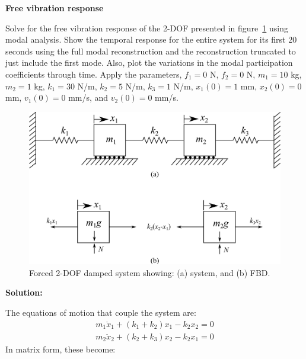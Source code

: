 \documentclass[12pt,letter]{article}
\begin{document}
	\begin{example}
	\textbf{Free vibration response}
	
	Solve for the free vibration response of the 2-DOF presented in figure~\ref{fig:2-DOF-spring_mass_horizontal_double_wall} using modal analysis. Show the temporal response for the entire system for its first 20 seconds using the full modal reconstruction and the reconstruction truncated to just include the first mode. Also, plot the variations in the modal participation coefficients through time. Apply the parameters, $f_1 = 0$ N, $f_2 = 0$ N, $m_1 = 10$ kg, $m_2 = 1$ kg, $k_1 = 30$ N/m, $k_2 = 5$ N/m, $k_3 = 1$ N/m, $x_1(0) = 1$ mm, $x_2(0) = 0$ mm, $v_1(0) = 0$ mm/s, and $v_2(0) = 0$ mm/s.
	
	\begin{figure}[H]
		\centering
		\includegraphics[]{../figures/2-DOF-spring_mass_horizontal_double_wall.png}
		\caption{Forced 2-DOF damped system showing: (a) system, and (b) FBD.}
		\label{fig:2-DOF-spring_mass_horizontal_double_wall}
	\end{figure}

\noindent \textbf{Solution:} 

The equations of motion that couple the system are:
	\begin{eqnarray}
	m_1\ddot{x}_1 + (k_1+k_2)x_1 - k_2x_2 = 0 \\
	m_2\ddot{x}_2 + (k_2+k_3)x_2 - k_2x_1 = 0 \nonumber
	\end{eqnarray}
	In matrix form, these become:
	

\end{example}
\end{document}
